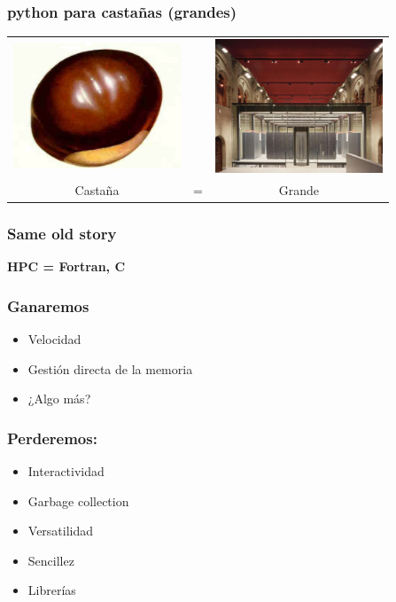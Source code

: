 \documentclass{beamer}
\begin{document}
\begin{frame}
 \frametitle{python para castañas (grandes)}
  \begin{center}
 \begin{tabular}[h]{ccc}
   \includegraphics[width=5cm]{files/castana.jpg}& &
   \includegraphics[width=5cm]{files/marenostrum.jpg}\\
   Castaña & = & Grande
 \end{tabular}
\end{center}
\end{frame}

\begin{frame}
  \frametitle{Same old story}
  \begin{center}
    \begin{Huge}
      \textbf{HPC = Fortran, C}
    \end{Huge}
  \end{center}
\end{frame}

\begin{frame}
  \frametitle{Ganaremos}
  \begin{itemize}
  \item Velocidad
  \item Gestión directa de la memoria
  \item ¿Algo más?
  \end{itemize}
\end{frame}

\begin{frame}
  \frametitle{Perderemos:}
  \begin{itemize}
  \item Interactividad
  \item Garbage collection
  \item Versatilidad
  \item Sencillez
  \item Librerías
  \end{itemize}
\end{frame}
\end{document}
